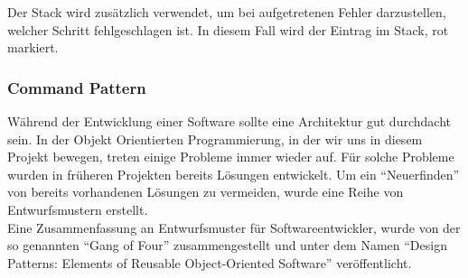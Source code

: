 Der Stack wird zusätzlich verwendet, um bei aufgetretenen Fehler darzustellen, welcher Schritt fehlgeschlagen ist. In diesem Fall wird der Eintrag im Stack, rot markiert.


\subsubsection{Command Pattern}
\label{subsubsec04:cmd_pattern}

Während der Entwicklung einer Software sollte eine Architektur gut durchdacht sein. In der Objekt Orientierten Programmierung, in der wir uns in diesem Projekt bewegen, treten einige Probleme immer wieder auf. Für solche Probleme wurden in früheren Projekten bereits Lösungen entwickelt. Um ein ``Neuerfinden'' von bereits vorhandenen Lösungen zu vermeiden, wurde eine Reihe von Entwurfsmustern erstellt. \\
Eine Zusammenfassung an Entwurfsmuster für Softwareentwickler, wurde von der so genannten ``Gang of Four'' zusammengestellt und unter dem Namen ``Design Patterns: Elements of Reusable Object-Oriented Software'' veröffentlicht.


